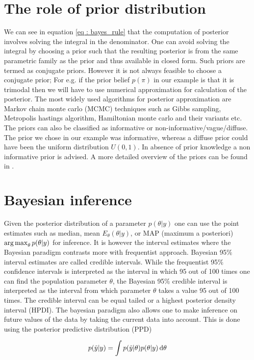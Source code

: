 \section{The role of prior distribution}
We can see in equation \ref{eq : bayes_rule} that the computation of posterior involves solving the integral in the denominator. One can avoid solving the integral by choosing a prior such that the resulting posterior is from the same parametric family as the prior and thus available in closed form. Such priors are termed as conjugate priors. However it is not always feasible to choose a conjugate prior; For e.g. if the prior belief $p(\pi)$ in our example is that it is trimodal then we will have to use numerical approximation for calculation of the posterior. The most widely used algorithms for posterior approximation are Markov chain monte carlo (MCMC) techniques such as Gibbs sampling, Metropolis hastings algorithm, Hamiltonian monte carlo and their variants etc. The priors can also be classified as informative or non-informative/vague/diffuse. The prior we chose in our example was informative, whereas a diffuse prior could have been the uniform distribution $U(0,1)$. In absence of prior knowledge a non informative prior is advised. A more detailed overview of the priors can be found in \citet{lesaffre_bayesian_2012}.

\section{Bayesian inference}
Given the posterior distribution of a parameter $p(\theta|y)$ one can use the point estimates such as median, mean $E_\theta(\theta|y)$, or MAP (maximum a posteriori) $\operatorname*{arg\,max}_\theta p(\theta|y)$ for inference. It is however the interval estimates where the Bayesian paradigm contrasts more with frequentist approach. Bayesian 95\% interval estimates are called credible intervals. While the frequentist 95\% confidence intervals is interpreted as the interval in which 95 out of 100 times one can find the population parameter $\theta$, the Bayesian 95\% credible interval is interpreted as the interval from which parameter $\theta$ takes a value 95 out of 100 times. The credible interval can be equal tailed or a highest posterior density interval (HPDI). The bayesian paradigm also allows one to make inference on future values of the data by taking the current data into account. This is done using the posterior predictive distribution (PPD)

$$p(\tilde{y}|y) = \int p(\tilde{y}|\theta) p(\theta|y) \mathop{}\!\mathrm{d}\theta$$

